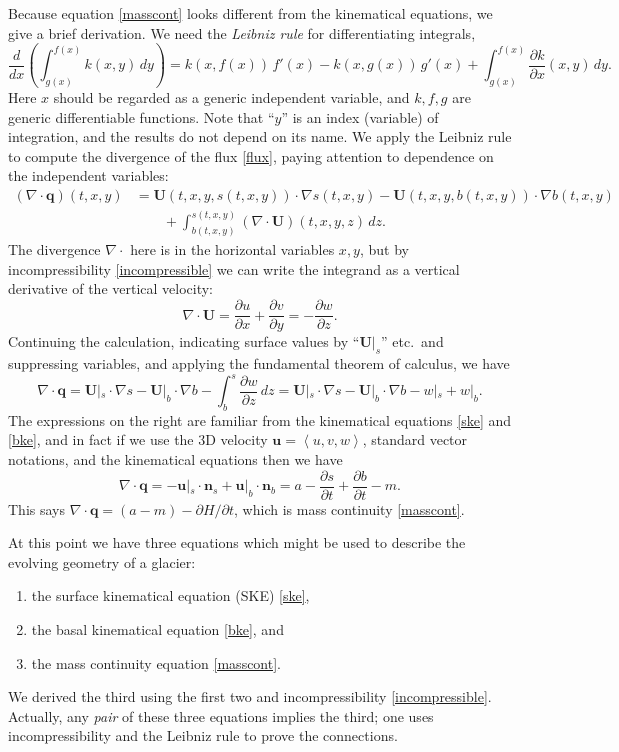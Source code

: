 \documentclass[letterpaper,final,12pt,reqno]{amsart}
\newcommand{\bn}{\mathbf{n}}
\newcommand{\bq}{\mathbf{q}}
\newcommand{\bu}{\mathbf{u}}
\newcommand{\bU}{\mathbf{U}}
\newcommand{\grad}{\nabla}
\newcommand{\Div}{\nabla\cdot}
\begin{document}
Because equation \eqref{masscont} looks different from the kinematical equations, we give a brief derivation.  We need the \emph{Leibniz rule} for differentiating integrals,
\begin{equation}
\frac{d}{dx}\left(\int_{g(x)}^{f(x)} k(x,y)\,dy\right) = k(x,f(x))\, f'(x) - k(x,g(x)) \, g'(x) + \int_{g(x)}^{f(x)} \frac{\partial k}{\partial x}(x,y)\,dy.  \label{leibniz}
\end{equation}
Here $x$ should be regarded as a generic independent variable, and $k,f,g$ are generic differentiable functions.  Note that ``$y$'' is an index (variable) of integration, and the results do not depend on its name.  We apply the Leibniz rule to compute the divergence of the flux \eqref{flux}, paying attention to dependence on the independent variables:
\begin{align*}
(\Div \bq) (t,x,y) &= \bU(t,x,y,s(t,x,y)) \cdot \grad s(t,x,y) - \bU(t,x,y,b(t,x,y)) \cdot \grad b(t,x,y) \\
   &\qquad + \int_{b(t,x,y)}^{s(t,x,y)} (\Div \bU)(t,x,y,z)\,dz.
\end{align*}
The divergence $\Div$ here is in the horizontal variables $x,y$, but by incompressibility \eqref{incompressible} we can write the integrand as a vertical derivative of the vertical velocity:
    $$\Div \bU = \frac{\partial u}{\partial x} + \frac{\partial v}{\partial y} = - \frac{\partial w}{\partial z}.$$
Continuing the calculation, indicating surface values by ``$\bU|_s$'' etc.~and suppressing variables, and applying the fundamental theorem of calculus, we have
    $$\Div \bq = \bU|_s \cdot \grad s - \bU|_b \cdot \grad b - \int_b^s \frac{\partial w}{\partial z}\,dz = \bU|_s \cdot \grad s - \bU|_b \cdot \grad b - w|_s + w|_b.$$
The expressions on the right are familiar from the kinematical equations \eqref{ske} and \eqref{bke}, and in fact if we use the 3D velocity $\bu=\left<u,v,w\right>$, standard vector notations, and the kinematical equations then we have
    $$\Div \bq = -\bu|_s \cdot \bn_s + \bu|_b \cdot \bn_b = a - \frac{\partial s}{\partial t} + \frac{\partial b}{\partial t} - m.$$
This says $\Div \bq = (a-m) - \partial H/\partial t$, which is mass continuity \eqref{masscont}.

At this point we have three equations which might be used to describe the evolving geometry of a glacier:
\renewcommand{\labelenumi}{\emph{\roman{enumi})}}
  \begin{enumerate}
  \item the surface kinematical equation (SKE) \eqref{ske},
  \item the basal kinematical equation \eqref{bke}, and
  \item the mass continuity equation \eqref{masscont}.  
  \end{enumerate}
We derived the third using the first two and incompressibility \eqref{incompressible}.  Actually, any \emph{pair} of these three equations implies the third; one uses incompressibility and the Leibniz rule to prove the connections.
\end{document}
